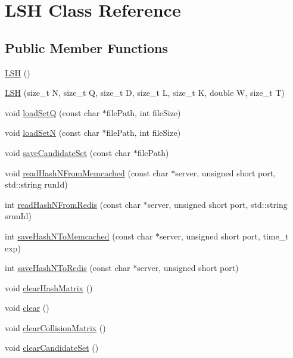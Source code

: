\hypertarget{classLSH}{}\section{L\+SH Class Reference}
\label{classLSH}
\subsection*{Public Member Functions}
\begin{DoxyCompactItemize}
\item 
\hyperlink{classLSH_a4108575cd2d786f617836750666dea26}{L\+SH} ()
\item 
\hyperlink{classLSH_a0564378fc619150ae6375c67dc4dc371}{L\+SH} (size\+\_\+t N, size\+\_\+t Q, size\+\_\+t D, size\+\_\+t L, size\+\_\+t K, double W, size\+\_\+t T)
\item 
void \hyperlink{classLSH_a0ad78d3a485f25389d5fb05ea9258ddd}{load\+SetQ} (const char $\ast$file\+Path, int file\+Size)
\item 
void \hyperlink{classLSH_abf8eda6f544bf126455b8ea8c7365d8c}{load\+SetN} (const char $\ast$file\+Path, int file\+Size)
\item 
void \hyperlink{classLSH_a9a68861557d2eaef8e73967c662172fd}{save\+Candidate\+Set} (const char $\ast$file\+Path)
\item 
void \hyperlink{classLSH_a0d33c96dac41082c80b23111838e382b}{read\+Hash\+N\+From\+Memcached} (const char $\ast$server, unsigned short port, std\+::string run\+Id)
\item 
int \hyperlink{classLSH_a00401a5252f4f7367821620f97409d43}{read\+Hash\+N\+From\+Redis} (const char $\ast$server, unsigned short port, std\+::string srun\+Id)
\item 
int \hyperlink{classLSH_afd93906929056fd0ccd0c09b166ea382}{save\+Hash\+N\+To\+Memcached} (const char $\ast$server, unsigned short port, time\+\_\+t exp)
\item 
int \hyperlink{classLSH_a0f442ddda8f63ad7ce0b316a0edf6a91}{save\+Hash\+N\+To\+Redis} (const char $\ast$server, unsigned short port)
\item 
void \hyperlink{classLSH_ab644fc625c34ec494facec1442d55ae0}{clear\+Hash\+Matrix} ()
\item 
void \hyperlink{classLSH_abe42075648c4ab27ba46b4a189670049}{clear} ()
\item 
void \hyperlink{classLSH_a0b797ae513e358e4d27b66128f7b57e8}{clear\+Collision\+Matrix} ()
\item 
void \hyperlink{classLSH_a2ac8c9b0325d18f60b76931f51cea0d9}{clear\+Candidate\+Set} ()

\end{DoxyCompactItemize}
